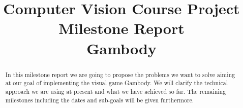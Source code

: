 \documentclass[conference,compsoc]{IEEEtran}
\begin{document}
\title{
	Computer Vision Course Project Milestone Report\\
	Gambody \\
}


\author{
}

\maketitle

\begin{abstract}
	In this milestone report we are going to propose the problems we want to solve aiming at our goal of implementing the visual game Gambody. We will clarify the technical approach we are using at present and what we have achieved so far. The remaining milestones including the dates and sub-goals will be given furthermore.
\end{abstract}
\end{document}
